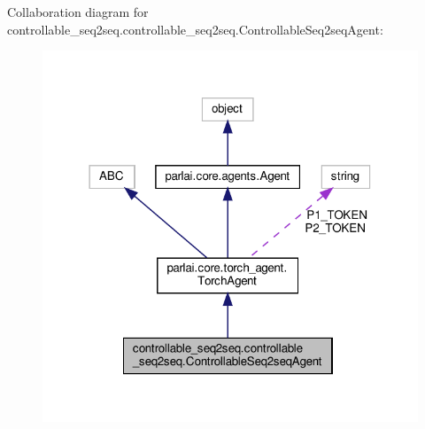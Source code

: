Collaboration diagram for controllable\+\_\+seq2seq.\+controllable\+\_\+seq2seq.\+Controllable\+Seq2seq\+Agent\+:
\nopagebreak
\begin{figure}[H]
\begin{center}
\leavevmode
\includegraphics[width=318pt]{classcontrollable__seq2seq_1_1controllable__seq2seq_1_1ControllableSeq2seqAgent__coll__graph}
\end{center}
\end{figure}
